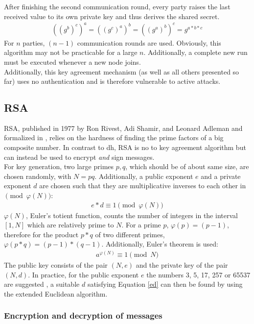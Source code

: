 After finishing the second communication round, every party raises the last received value to its own private key and thus derives the shared secret.
\begin{align}
 ((g^b)^c)^a = ((g^c)^a)^b = ((g^a)^b)^c = g^{a*b*c}
\end{align}
For $n$ parties, $(n-1)$ communication rounds are used. Obviously, this algorithm may not be practicable for a large $n$. Additionally,
a complete new run must be executed whenever a new node joins.
\\
Additionally, this key agreement mechanism (as well as all others presented so far) uses no authentication and is therefore vulnerable to active attacks.

\subsection{RSA}

RSA, published in 1977 by Ron Rivest, Adi Shamir, and Leonard Adleman \cite{RSA} and formalized in \cite{pkcs1},
relies on the hardness of finding the prime factors of a big composite number.
In contrast to \gls{dh}, RSA is no to key agreement algorithm but can instead be used to encrypt \textit{and} sign messages. 
\\
For key generation, 
two large primes $p, q$, which should be of about same size, are chosen randomly, with $N = pq$. Additionally, a public exponent $e$ and a private exponent
$d$ are chosen such that they are multiplicative inverses to each other in $\pmod{\varphi(N)}$:
\begin{align}\label{ed}
 e * d \equiv 1 \pmod {\varphi(N)}
\end{align}
$\varphi(N)$, Euler's totient function, counts the number of integers in the interval $[1, N]$ which are relatively prime to $N$.
For a prime $p$, $\varphi(p) = (p-1)$, therefore for the product
$p*q$ of two different primes, $\varphi(p*q) = (p-1) * (q-1)$.
Additionally, Euler's theorem is used:
\begin{align}\label{euler}
a^{\varphi(N)} \equiv 1 \pmod N
\end{align}
The public key consists of the pair  $(N, e)$ and the private key of the pair $(N, d)$.
In practice, for the public exponent $e$ the numbers 3, 5, 17, 257 or 65537 are suggested \cite{891000}, a suitable $d$ satisfying Equation \ref{ed} can then be found
by using the extended Euclidean algorithm.

\subsubsection{Encryption and decryption of messages}

